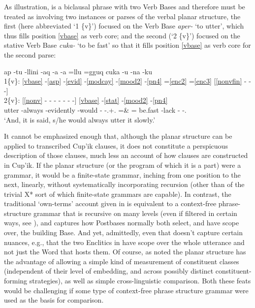 \documentclass[output=paper]{langscibook}
\begin{document}
As illustration,  is a biclausal phrase with two Verb Bases and therefore must be treated as involving two instances or parses of the verbal planar structure, the first (here abbreviated `1 \{v\}') focused on the Verb Base \textit{aper-} `to utter', which thus fills position \ref{vbase} as verb core; and the second (`2 \{v\}') focused on the stative Verb Base \textit{cuka-} `to be fast' so that it fills position \ref{vbase} as verb core for the second parse:

\ea\label{ex:key:21}
\gllll {} ap -tu -llini -aq -a -a =llu =gguq cuka -u -na -ku \\
    1\{v\}: \ref{vbase} -\ref{asp} -\ref{evid} -\ref{modcay} -\ref{mood2} -\ref{pn4} =\ref{enc2} =\ref{enc3} [\ref{nonvfin} - - -] \\
    2\{v\}: [\ref{nonv} - - - - - - -] \ref{vbase} -\ref{stat} -\ref{mood2} -\ref{pn4} \\
     {} utter -always -evidently -would -\Ind{} -\Tsg.\Aarg{}+\Tsg.\Obj{} =\& =\Quot{} be.fast -lack -\Appos{} -\Tsg.\Obj{} \\
\glt `And, it is said, s/he would always utter it slowly.'
\z

It cannot be emphasized enough that, although the planar structure can be applied to transcribed Cup'ik clauses, it does not constitute a perspicuous description of those clauses, much less an account of how clauses are constructed in Cup'ik. If the planar structure (or the program of which it is a part) were a grammar, it would be a finite-state grammar, inching from one position to the next, linearly, without systematically incorporating recursion (other than of the trivial X* sort of which finite-state grammars are capable). In contrast, the traditional `own-terms' account given in  is equivalent to a context-free phrase-structure grammar that is recursive on many levels (even if filtered in certain ways, see ), and captures how Postbases normally both select, and have scope over, the building Base. And yet, admittedly, even that doesn't capture certain nuances, e.g., that the two Enclitics in  have scope over the whole utterance and not just the Word that hosts them. Of course, as noted the planar structure has the advantage of allowing a simple kind of measurement of constituent classes (independent of their level of embedding, and across possibly distinct constituent-forming strategies), as well as simple cross-linguistic comparison. Both these feats would be challenging if some type of context-free phrase structure grammar were used as the basis for comparison.
\end{document}
